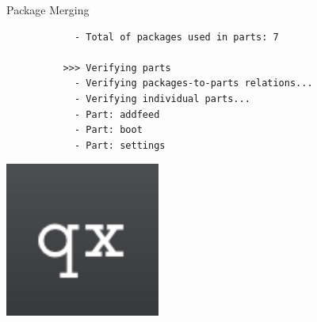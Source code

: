 \documentclass[final]{beamer}
\newlength{\onecolwid}
\begin{document}
\begin{frame}[t]
\begin{columns}[t]
\begin{column}{\onecolwid}
\begin{block}{Package Merging}
\begin{verbatim}
            - Total of packages used in parts: 7

          >>> Verifying parts  
            - Verifying packages-to-parts relations...
            - Verifying individual parts...
            - Part: addfeed
            - Part: boot
            - Part: settings
        \end{verbatim}

        \vspace{0.75in}
        \begin{center}
          \includegraphics[width=2in]{qx.png}
        \end{center}
      \end{block}

    \end{column}

  \end{columns}
\end{frame}
\end{document}
